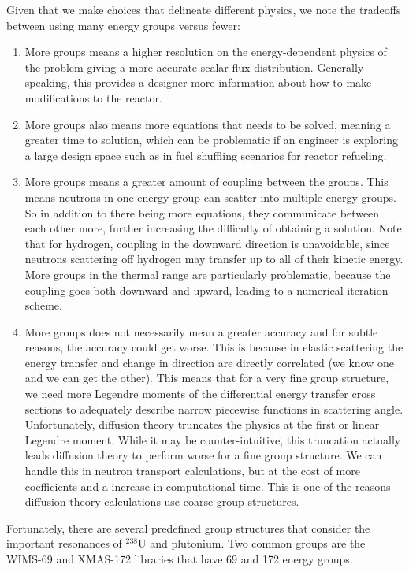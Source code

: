 Given that we make choices that delineate different physics, we note the tradeoffs between using many energy groups versus fewer:
\begin{enumerate}
  \item More groups means a higher resolution on the energy-dependent physics of the problem giving a more accurate scalar flux distribution. Generally speaking, this provides a designer more information about how to make modifications to the reactor.
  \item More groups also means more equations that needs to be solved, meaning a greater time to solution, which can be problematic if an engineer is exploring a large design space such as in fuel shuffling scenarios for reactor refueling.
  \item More groups means a greater amount of coupling between the groups. This means neutrons in one energy group can scatter into multiple energy groups. So in addition to there being more equations, they communicate between each other more, further increasing the difficulty of obtaining a solution. Note that for hydrogen, coupling in the downward direction is unavoidable, since neutrons scattering off hydrogen may transfer up to all of their kinetic energy. More groups in the thermal range are particularly problematic, because the coupling goes both downward and upward, leading to a numerical iteration scheme.
  \item More groups does not necessarily mean a greater accuracy and for subtle reasons, the accuracy could get worse. This is because in elastic scattering the energy transfer and change in direction are directly correlated (we know one and we can get the other). This means that for a very fine group structure, we need more Legendre moments of the differential energy transfer cross sections to adequately describe narrow piecewise functions in scattering angle. Unfortunately, diffusion theory truncates the physics at the first or linear Legendre moment. While it may be counter-intuitive, this truncation actually leads diffusion theory to perform worse for a fine group structure. We can handle this in neutron transport calculations, but at the cost of more coefficients and a increase in computational time. This is one of the reasons diffusion theory calculations use coarse group structures.
\end{enumerate}

Fortunately, there are several predefined group structures that consider the important resonances of $^{238}$U and plutonium. Two common groups are the WIMS-69 and XMAS-172 libraries that have 69 and 172 energy groups.

